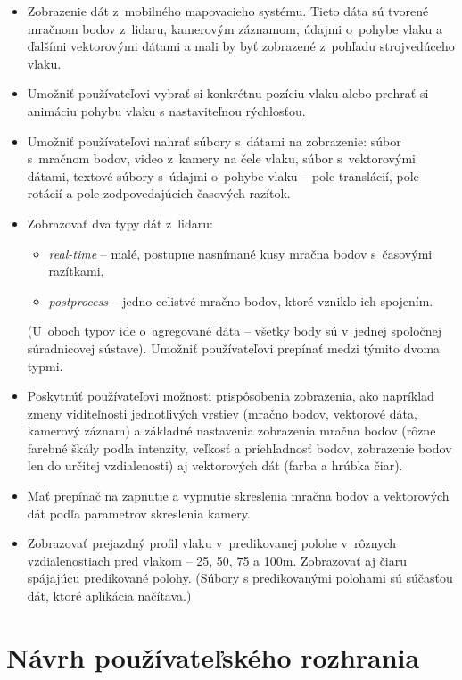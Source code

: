 \begin{itemize}
    \item Zobrazenie dát z~mobilného mapovacieho systému. Tieto dáta sú tvorené mračnom bodov z~lidaru, kamerovým záznamom, údajmi o~pohybe vlaku a ďalšími vektorovými dátami a mali by byť zobrazené z~pohľadu strojvedúceho vlaku.
    \item Umožniť používateľovi vybrať si konkrétnu pozíciu vlaku alebo prehrať si animáciu pohybu vlaku s nastaviteľnou rýchlosťou.
    \item Umožniť používateľovi nahrať súbory s~dátami na zobrazenie: súbor s~mračnom bodov, video z~kamery na čele vlaku, súbor s~vektorovými dátami, textové súbory s~údajmi o~pohybe vlaku -- pole translácií, pole rotácií a pole zodpovedajúcich časových razítok.
    \item Zobrazovať dva typy dát z~lidaru:
    \begin{itemize}
        \item \emph{real-time} -- malé, postupne nasnímané kusy mračna bodov s~časovými razítkami,
        \item \emph{postprocess} -- jedno celistvé mračno bodov, ktoré vzniklo ich spojením.
    \end{itemize}
    (U~oboch typov ide o~agregované dáta -- všetky body sú v~jednej spoločnej súradnicovej sústave). Umožniť používateľovi prepínať medzi týmito dvoma typmi.
    \item Poskytnúť používateľovi možnosti prispôsobenia zobrazenia, ako napríklad zmeny viditeľnosti jednotlivých vrstiev (mračno bodov, vektorové dáta, kamerový záznam) a základné nastavenia zobrazenia mračna bodov (rôzne farebné škály podľa intenzity, veľkosť a priehľadnosť bodov, zobrazenie bodov len do určitej vzdialenosti) aj vektorových dát (farba a hrúbka čiar).
    \item Mať prepínač na zapnutie a vypnutie skreslenia mračna bodov a vektorových dát podľa parametrov skreslenia kamery.
    \item Zobrazovať prejazdný profil vlaku v~predikovanej polohe v~rôznych vzdialenostiach pred vlakom -- 25, 50, 75 a 100m. Zobrazovať aj čiaru spájajúcu predikované polohy. (Súbory s predikovanými polohami sú súčasťou dát, ktoré aplikácia načítava.)

\end{itemize}

\section{Návrh používateľského rozhrania}

